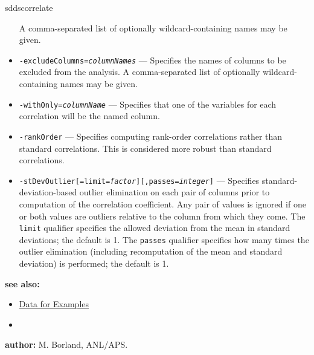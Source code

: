 \begin{sddsprog}{sddscorrelate}
\begin{itemize}
    A comma-separated list of optionally wildcard-containing names may be given.
  \item {\tt -excludeColumns={\em columnNames}} --- Specifies the names of columns to be excluded from the
    analysis. A comma-separated list of optionally wildcard-containing names may be given.
  \item {\tt -withOnly={\em columnName}} --- Specifies that one of the variables for each correlation will be
    the named column.
  \item {\tt -rankOrder} --- Specifies computing rank-order correlations rather than standard correlations.
    This is considered more robust than standard correlations.
  \item {\tt -stDevOutlier[=limit={\em factor}][,passes={\em integer}]} --- Specifies standard-deviation-based
    outlier elimination on each pair of columns prior to computation of the correlation coefficient.
    Any pair of values is ignored if one or both values are outliers relative to the column from which they come.
    The {\tt limit} qualifier specifies the allowed deviation from the mean in standard deviations; the
    default is 1. The {\tt passes} qualifier specifies how many times the outlier elimination (including
    recomputation of the mean and standard deviation) is performed; the default is 1.
  \end{itemize}
\item {\bf see also:}
  \begin{itemize}
  \item \hyperref[exampleData]{Data for Examples}
  \item {}
  \end{itemize}
\item {\bf author:} M. Borland, ANL/APS.
\end{sddsprog}

